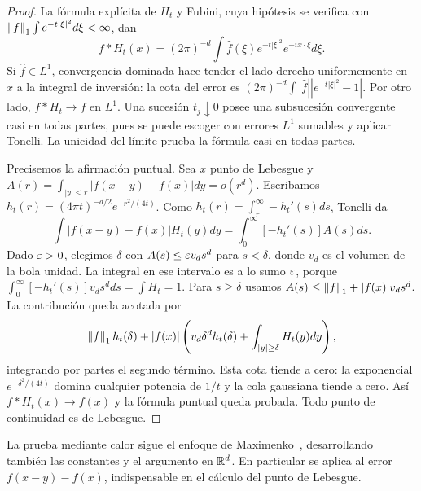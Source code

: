 \begin{proof}
La fórmula explícita de $H_t$ y Fubini, cuya hipótesis se verifica con $\left\lVert f\right\rVert_1\int e^{-t|\xi|^2}d\xi<\infty$, dan
\[
 f*H_t(x)=(2\pi)^{-d}\int\widehat f(\xi)e^{-t|\xi|^2}e^{-ix\cdot\xi}d\xi.
\]
Si $\widehat f\in L^1$, convergencia dominada hace tender el lado derecho uniformemente en $x$ a la integral de inversión: la cota del error es $(2\pi)^{-d}\int|\widehat f||e^{-t|\xi|^2}-1|$. Por otro lado, $f*H_t\to f$ en $L^1$. Una sucesión $t_j\downarrow0$ posee una subsucesión convergente casi en todas partes, pues se puede escoger con errores $L^1$ sumables y aplicar Tonelli. La unicidad del límite prueba la fórmula casi en todas partes.

Precisemos la afirmación puntual. Sea $x$ punto de Lebesgue y $A(r)=\int_{|y|<r}|f(x-y)-f(x)|dy=o(r^d)$. Escribamos $h_t(r)=(4\pi t)^{-d/2}e^{-r^2/(4t)}$. Como $h_t(r)=\int_r^\infty-h_t'(s)ds$, Tonelli da
\[
 \int |f(x-y)-f(x)|H_t(y)dy
 =\int_0^\infty[-h_t'(s)]A(s)ds.
\]
Dado $\varepsilon>0$, elegimos $\delta$ con $A(s)\leq\varepsilon v_ds^d$ para $s<\delta$, donde $v_d$ es el volumen de la bola unidad. La integral en ese intervalo es a lo sumo $\varepsilon$, porque $\int_0^\infty[-h_t'(s)]v_ds^d ds=\int H_t=1$. Para $s\geq\delta$ usamos $A(s)\leq\left\lVert f\right\rVert_1+|f(x)|v_ds^d$. La contribución queda acotada por
\[
 \left\lVert f\right\rVert_1h_t(\delta)+|f(x)|\left(v_d\delta^dh_t(\delta)+\int_{|y|\geq\delta}H_t(y)dy\right),
\]
integrando por partes el segundo término. Esta cota tiende a cero: la exponencial $e^{-\delta^2/(4t)}$ domina cualquier potencia de $1/t$ y la cola gaussiana tiende a cero. Así $f*H_t(x)\to f(x)$ y la fórmula puntual queda probada. Todo punto de continuidad es de Lebesgue.
\end{proof}
La prueba mediante calor sigue el enfoque de Maximenko~\cite{maximenkoInversion}, desarrollando también las constantes y el argumento en $\mathbb R^d$. En particular se aplica al error $f(x-y)-f(x)$, indispensable en el cálculo del punto de Lebesgue.

